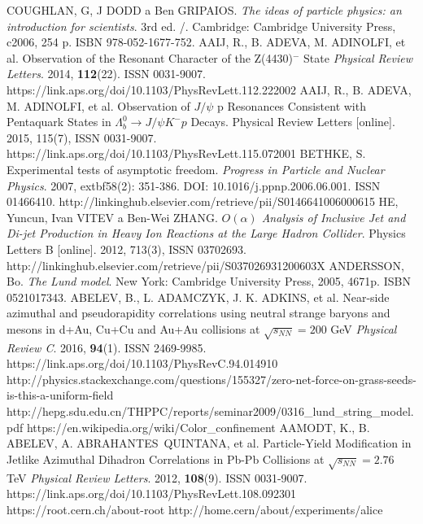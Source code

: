 \documentclass[thesismargins, thesislinespacing]{rnthesis}
\begin{document}
\renewcommand{\bibname}{Zoznam pou�itej literat�ry}
\begin{thebibliography}{}
COUGHLAN, G, J DODD a Ben GRIPAIOS. \textit{The ideas of particle physics: an introduction for scientists}. 3rd ed. /. Cambridge: Cambridge University Press, c2006, 254 p. ISBN 978-052-1677-752.
AAIJ, R., B. ADEVA, M. ADINOLFI, et al. Observation of the Resonant Character of the Z(4430)$^{-}$ State \textit{Physical Review Letters}. 2014, \textbf{112}(22). ISSN 0031-9007. https://link.aps.org/doi/10.1103/PhysRevLett.112.222002
AAIJ, R., B. ADEVA, M. ADINOLFI, et al. Observation of $J / \psi$ p Resonances Consistent with Pentaquark States in $\Lambda_b^0 \rightarrow J / \psi K^{-}p$ Decays. Physical Review Letters [online]. 2015, 115(7),  ISSN 0031-9007. https://link.aps.org/doi/10.1103/PhysRevLett.115.072001
BETHKE, S. Experimental tests of asymptotic freedom. \textit{Progress in Particle and Nuclear Physics}. 2007, extbf{58}(2): 351-386. DOI: 10.1016/j.ppnp.2006.06.001. ISSN 01466410.  http://linkinghub.elsevier.com/retrieve/pii/S0146641006000615
HE, Yuncun, Ivan VITEV a Ben-Wei ZHANG. 
\textit{ $O(\alpha)$ Analysis of Inclusive Jet and Di-jet Production in Heavy Ion Reactions at the Large Hadron Collider}. Physics Letters B [online]. 2012, 713(3), ISSN 03702693. http://linkinghub.elsevier.com/retrieve/pii/S037026931200603X
ANDERSSON, Bo. \textit{The Lund model}. New York: Cambridge University Press, 2005, 4671p. ISBN 0521017343.
ABELEV, B., L. ADAMCZYK, J. K. ADKINS, et al. Near-side azimuthal and pseudorapidity correlations using neutral strange baryons and mesons in d+Au, Cu+Cu and Au+Au collisions at $\sqrt{s_{NN}}=200$ GeV \textit{Physical Review C}. 2016, \textbf{94}(1). ISSN 2469-9985. https://link.aps.org/doi/10.1103/PhysRevC.94.014910
http://physics.stackexchange.com/questions/155327/zero-net-force-on-grass-seeds-is-this-a-uniform-field
http://hepg.sdu.edu.cn/THPPC/reports/seminar2009/0316\_lund\_string\_model.pdf
https://en.wikipedia.org/wiki/Color\_confinement
AAMODT, K., B. ABELEV, A. ABRAHANTES QUINTANA, et al. Particle-Yield Modification in Jetlike Azimuthal Dihadron Correlations in Pb-Pb Collisions at $\sqrt{s_{NN}} = 2.76$ TeV \textit{Physical Review Letters}. 2012, \textbf{108}(9). ISSN 0031-9007. https://link.aps.org/doi/10.1103/PhysRevLett.108.092301
https://root.cern.ch/about-root
http://home.cern/about/experiments/alice


\end{thebibliography}
\end{document}
